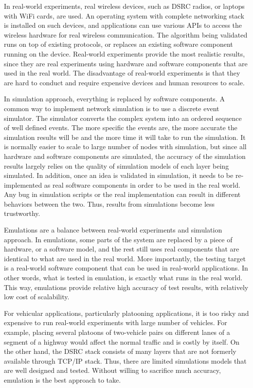 \documentclass[12pt]{report}
\begin{document}
In real-world experiments, real wireless devices, such as DSRC radios, or laptops with WiFi cards, are used. An operating system with complete networking stack is installed on such devices, and applications can use various APIs to access the wireless hardware for real wireless communication. The algorithm being validated runs on top of existing protocols, or replaces an existing software component running on the device. Real-world experiments provide the most realistic results, since they are real experiments using hardware and software components that are used in the real world. The disadvantage of real-world experiments is that they are hard to conduct and require expensive devices and human resources to scale.

In simulation approach, everything is replaced by software components. A common way to implement network simulation is to use a discrete event simulator. The simulator converts the complex system into an ordered sequence of well defined events. The more specific the events are, the more accurate the simulation results will be and the more time it will take to run the simulation. It is normally easier to scale to large number of nodes with simulation, but since all hardware and software components are simulated, the accuracy of the simulation results largely relies on the quality of simulation models of each layer being simulated. In addition, once an idea is validated in simulation, it needs to be re-implemented as real software components in order to be used in the real world. Any bug in simulation scripts or the real implementation can result in different behaviors between the two. Thus, results from simulations become less trustworthy.

Emulations are a balance between real-world experiments and simulation approach. In emulations, some parts of the system are replaced by a piece of hardware, or a software model, and the rest still uses real components that are identical to what are used in the real world. More importantly, the testing target is a real-world software component that can be used in real-world applications. In other words, what is tested in emulation, is exactly what runs in the real world. This way, emulations provide relative high accuracy of test results, with relatively low cost of scalability.

For vehicular applications, particularly platooning applications, it is too risky and expensive to run real-world experiments with large number of vehicles. For example, placing several platoons of two-vehicle pairs on different lanes of a segment of a highway would affect the normal traffic and is costly by itself. On the other hand, the DSRC stack consists of many layers that are not formerly available through TCP/IP stack. Thus, there are limited simulations models that are well designed and tested. Without willing to sacrifice much accuracy, emulation is the best approach to take.
\end{document}
